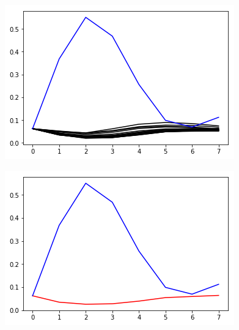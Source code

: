 \begin{figure}[H]
\centering \includegraphics[width=0.3\linewidth]{img/groverall5e-6loss.png}
\caption{}
\end{figure}


\begin{figure}[H]
\centering \includegraphics[width=0.3\linewidth]{img/groverpair5e-6loss.png}
\caption{}
\end{figure}


